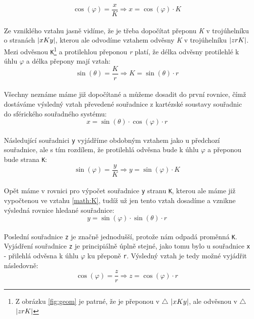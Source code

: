 \begin{equation}
 \cos (\varphi) = \frac{x}{K}  \Rightarrow x = \cos (\varphi) \cdot K
\end{equation}
\\
Ze vzniklého vztahu jasně vidíme, že je třeba dopočítat přeponu \textit{K} v trojúhelníku  o stranách $\arrowvert xKy\arrowvert$, kterou ale odvodíme vztahem odvěsny \textit{K} v trojúhelníku $\arrowvert zrK\arrowvert$. Mezi odvěsnou \texttt{K}\footnote{Z obrázku \ref{fig:geom} je patrné, že je přeponou v $\bigtriangleup$ $\arrowvert xKy\arrowvert$, ale odvěsnou v $\bigtriangleup$ $\arrowvert zrK\arrowvert$} a protilehlou přeponou \textit{r} platí, že délka odvěsny protilehlé k úhlu $\varphi$ a délka přepony \cite{Goniometrie} mají vztah:
\\
\begin{equation}
\label{math:K}
\sin (\theta) = \frac{K}{r}  \Rightarrow K = \sin (\theta) \cdot r
\end{equation}
\\
Všechny neznáme máme již dopočítané a můžeme dosadit do první rovnice, čímž dostáváme výsledný vztah převedené souřadnice z kartézské soustavy souřadnic do sférického souřadného systému:
\\
\begin{equation}
\label{math:x}
x = \sin (\theta) \cdot  \cos (\varphi) \cdot r
\end{equation}
\\
Následující souřadnici \texttt{y} vyjádříme obdobným vztahem jako u předchozí souřadnice, ale s tím rozdílem, že protilehlá odvěsna bude k úhlu $\varphi$ a přeponou bude strana \texttt{K}:
\\
\begin{displaymath}
\sin (\varphi) = \frac{y}{K}  \Rightarrow y = \sin (\varphi) \cdot K
\end{displaymath}
\\
Opět máme v rovnici pro výpočet souřadnice \texttt{y} stranu \texttt{K}, kterou ale máme již vypočtenou ve vztahu \ref{math:K}, tudíž už jen tento vztah dosadíme a vznikne výsledná rovnice hledané  souřadnice:
\\
\begin{equation}
\label{math:y}
y = \sin (\varphi) \cdot \sin (\theta) \cdot r
\end{equation}
\\
Poslední souřadnice \texttt{z} je značně jednodušší, protože nám odpadá proměnná \texttt{K}. Vyjádření souřadnice \texttt{z} je principiálně úplně stejné, jako tomu bylo u souřadnice \texttt{x} - přilehlá odvěsna k úhlu $\varphi$ ku přeponě \texttt{r}. Výsledný vztah je tedy možné vyjádřit následovně:
\\
\begin{equation}
\label{math:z}
\cos (\varphi) = \frac{z}{r} \Rightarrow z = \cos (\varphi) \cdot r
\end{equation}

